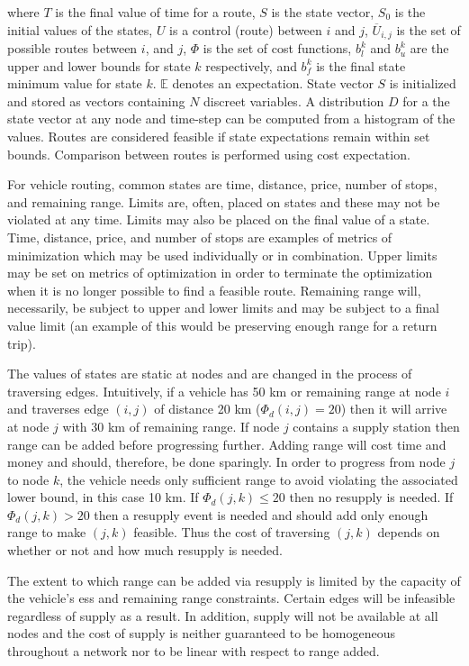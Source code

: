 \documentclass[11pt]{article}
\begin{document}
\begin{multicols}{2}
\noindent where $T$ is the final value of time for a route, $S$ is the state vector, $S_0$ is the initial values of the states, $U$ is a control (route) between $i$ and $j$, $\overline{U}_{i,j}$ is the set of possible routes between $i$, and $j$, $\Phi$ is the set of cost functions, $b^k_l$ and $b^k_u$ are the upper and lower bounds for state $k$ respectively, and $b^k_f$ is the final state minimum value for state $k$. $\mathbb{E}$ denotes an expectation. State vector $S$ is initialized and stored as vectors containing $N$ discreet variables. A distribution $D$ for a the state vector at any node and time-step can be computed from a histogram of the values. Routes are considered feasible if state expectations remain within set bounds. Comparison between routes is performed using cost expectation.

For vehicle routing, common states are time, distance, price, number of stops, and remaining range. Limits are, often, placed on states and these may not be violated at any time. Limits may also be placed on the final value of a state. Time, distance, price, and number of stops are examples of metrics of minimization which may be used individually or in combination. Upper limits may be set on metrics of optimization in order to terminate the optimization when it is no longer possible to find a feasible route. Remaining range will, necessarily, be subject to upper and lower limits and may be subject to a final value limit (an example of this would be preserving enough range for a return trip).

The values of states are static at nodes and are changed in the process of traversing edges. Intuitively, if a vehicle has 50 km or remaining range at node $i$ and traverses edge $(i, j)$ of distance 20 km ($\Phi_d(i,j) = 20$) then it will arrive at node $j$ with 30 km of remaining range. If node $j$ contains a supply station then range can be added before progressing further. Adding range will cost time and money and should, therefore, be done sparingly. In order to progress from node $j$ to node $k$, the vehicle needs only sufficient range to avoid violating the associated lower bound, in this case 10 km. If $\Phi_d(j,k) \leq 20$ then no resupply is needed. If $\Phi_d(j,k) > 20$ then a resupply event is needed and should add only enough range to make $(j,k)$ feasible. Thus the cost of traversing $(j,k)$ depends on whether or not and how much resupply is needed. 

The extent to which range can be added via resupply is limited by the capacity of the vehicle's \gls{ess} and remaining range constraints. Certain edges will be infeasible regardless of supply as a result. In addition, supply will not be available at all nodes and the cost of supply is neither guaranteed to be homogeneous throughout a network nor to be linear with respect to range added.


\end{multicols}
\end{document}
